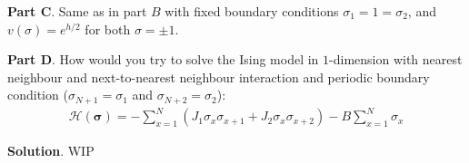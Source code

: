 \documentclass[../../main.tex]{subfiles}
\begin{document}
\begin{exo}
    \medskip

    \textbf{Part C}. Same as in part $B$ with fixed boundary conditions $\sigma_1 = 1 = \sigma_2$, and $v(\sigma) = e^{h/2}$ for both $\sigma=\pm 1$.
    
    \medskip

    \textbf{Part D}. How would you try to solve the Ising model in $1$-dimension with nearest neighbour and next-to-nearest neighbour interaction and periodic boundary condition ($\sigma_{N+1} = \sigma_1$ and $\sigma_{N+2} = \sigma_2$):
    \begin{align*}
        \mathcal{H}(\bm{\sigma}) = -\sum_{x=1}^N (J_1 \sigma_x \sigma_{x+1} + J_2 \sigma_x \sigma_{x+2}) - B \sum_{x=1}^N \sigma_x
    \end{align*} 

    \medskip

    \textbf{Solution}. WIP %
     
\end{exo}

\end{document}

